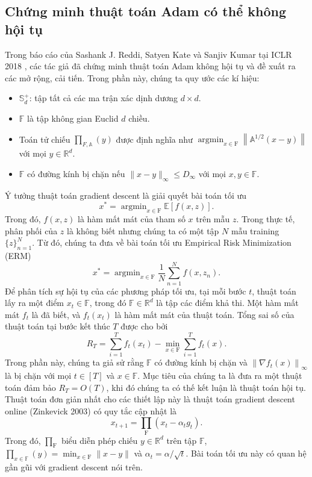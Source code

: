 \documentclass[11pt,oneside,a4paper]{report}
\theoremstyle{definition}
\begin{document}
\subsection{Chứng minh thuật toán Adam có thể không hội tụ}
Trong báo cáo của Sashank J. Reddi, Satyen Kate và Sanjiv Kumar tại ICLR 2018 \cite{8}, các tác giả đã chứng minh thuật toán Adam không hội tụ và đề xuất ra các mở rộng, cải tiến.
Trong phần này, chúng ta quy ước các kí hiệu:
\begin{itemize}
\item $\mathbb{S}_d^{+}$: tập tất cả các ma trận xác dịnh dương $d \times d$.
\item $\mathbb{F}$ là tập không gian Euclid $d$ chiều.
\item Toán tử chiếu $\prod_{F, \mathbb{A}}(y)$ được định nghĩa như $\operatorname{argmin}_{x \in \mathrm{F}}\left\|\mathbb{A}^{1 / 2}(x-y)\right\|$ với mọi $y \in \mathbb{R}^d$.
\item $\mathbb{F}$ có đường kính bị chặn nếu $\|x-y\|_{\infty} \leq D_{\infty}$ với mọi $x, y \in \mathbb{F}$.
\end{itemize}
Ý tưởng thuật toán gradient descent là giải quyết bài toán tối ưu
$$
x^*=\operatorname{argmin}_{x \in \mathrm{F}} \mathbb{E}[f(x, z)].
$$
Trong đó, $f(x, z)$ là hàm mất mát của tham số $x$ trên mẫu $z$.
Trong thực tế, phân phối của $z$ là không biết nhưng chúng ta có một tập $N$ mẫu training $\{z\}_{n=1}^N$. Từ đó, chúng ta đưa về bài toán tối ưu Empirical Risk Minimization (ERM)
$$
x^*=\operatorname{argmin}_{x \in \mathrm{F}} \dfrac{1}{N} \sum_{n=1}^N f\left(x, z_n\right).
$$
Để phân tích sự hội tụ của các phương pháp tối ưu, tại mỗi bước $t$, thuật toán lấy ra một điểm $x_t \in \mathbb{F}$, trong đó $\mathbb{F} \in \mathbb{R}^d$ là tập các điểm khả thi. Một hàm mất mát $f_t$ là đã biết, và  $f_t\left(x_t\right)$ là hàm mất mát của thuật toán. Tổng sai số của thuật toán tại bước kết thúc $T$ được cho bởi
$$
R_T=\sum_{i=1}^T f_t\left(x_t\right)-\min _{x \in \mathrm{F}} \sum_{i=1}^T f_t(x).
$$
Trong phần này, chúng ta giả sử rằng $\mathbb{F}$ có đường kính bị chặn và $\left\|\nabla f_t(x)\right\|_{\infty}$ là bị chặn với mọi $t \in[T]$ và $x \in \mathbb{F}$. Mục tiêu của chúng ta là đưa ra một thuật toán đảm bảo $R_T=O(T)$, khi đó chúng ta có thế kết luận là thuật toán hội tụ. Thuật toán đơn giản nhất cho các thiết lập này là thuật toán gradient descent online (Zinkevick 2003) có quy tắc cập nhật là
$$
x_{t+1}=\prod_{\mathrm{F}}\left(x_t-\alpha_t g_t\right).
$$
Trong đó, $\prod_{\mathrm{F}}$ biểu diễn phép chiếu $y \in \mathbb{R}^d$ trên tập $\mathbb{F}$, $\prod_{x \in \mathbb{F}}(y)=\min _{x \in \mathrm{F}}\|x-y\|$ và $\alpha_t=\alpha / \sqrt{t}$. Bài toán tối ưu này có quan hệ gần gũi với gradient descent nói trên.
\end{document}
